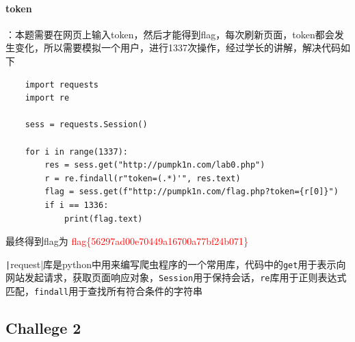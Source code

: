 \documentclass{article}
\begin{document}
\paragraph*{token}：本题需要在网页上输入token，然后才能得到flag，每次刷新页面，token都会发生变化，所以需要模拟一个用户，进行1337次操作，经过学长的讲解，解决代码如下
\begin{verbatim}
    import requests
    import re

    sess = requests.Session()

    for i in range(1337):
        res = sess.get("http://pumpk1n.com/lab0.php")
        r = re.findall(r"token=(.*)'", res.text)
        flag = sess.get(f"http://pumpk1n.com/flag.php?token={r[0]}")
        if i == 1336:
            print(flag.text)
\end{verbatim}   
     最终得到flag为\textcolor{red}{ flag\{56297ad00e70449a16700a77bf24b071\}}
   \par 
     \texttt|request|库是python中用来编写爬虫程序的一个常用库，代码中的\texttt{get}用于表示向网站发起请求，获取页面响应对象，\texttt{Session}用于保持会话，\texttt{re}库用于正则表达式匹配，\texttt{findall}用于查找所有符合条件的字符串
\subsection*{Challege 2}
\end{document}
